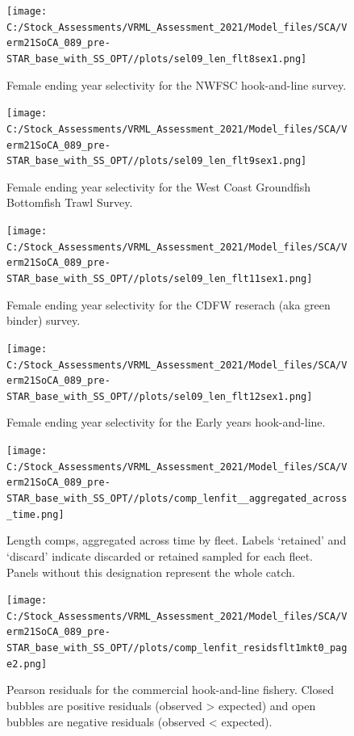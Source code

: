 \documentclass[11pt,
  english,
  a4paper,
]{article}
\begin{document}
\begin{figure}
\centering
\texttt{[image: C:/Stock\_Assessments/VRML\_Assessment\_2021/Model\_files/SCA/Verm21SoCA\_089\_pre-STAR\_base\_with\_SS\_OPT//plots/sel09\_len\_flt8sex1.png]}
\caption{Female ending year selectivity for the NWFSC hook-and-line survey.\label{fig:endyr-selex-NWFSC-HKL}}
\end{figure}

\begin{figure}
\centering
\texttt{[image: C:/Stock\_Assessments/VRML\_Assessment\_2021/Model\_files/SCA/Verm21SoCA\_089\_pre-STAR\_base\_with\_SS\_OPT//plots/sel09\_len\_flt9sex1.png]}
\caption{Female ending year selectivity for the West Coast Groundfish Bottomfish Trawl Survey.\label{fig:endyr-selex-NWFSC-TWL}}
\end{figure}

\begin{figure}
\centering
\texttt{[image: C:/Stock\_Assessments/VRML\_Assessment\_2021/Model\_files/SCA/Verm21SoCA\_089\_pre-STAR\_base\_with\_SS\_OPT//plots/sel09\_len\_flt11sex1.png]}
\caption{Female ending year selectivity for the CDFW reserach (aka green binder) survey.\label{fig:endyr-selex-CDFW-RESEARCH}}
\end{figure}

\begin{figure}
\centering
\texttt{[image: C:/Stock\_Assessments/VRML\_Assessment\_2021/Model\_files/SCA/Verm21SoCA\_089\_pre-STAR\_base\_with\_SS\_OPT//plots/sel09\_len\_flt12sex1.png]}
\caption{Female ending year selectivity for the Early years hook-and-line.\label{fig:endyr-selex-EARLY-HKL}}
\end{figure}

\FloatBarrier

\FloatBarrier

\begin{figure}
\centering
\texttt{[image: C:/Stock\_Assessments/VRML\_Assessment\_2021/Model\_files/SCA/Verm21SoCA\_089\_pre-STAR\_base\_with\_SS\_OPT//plots/comp\_lenfit\_\_aggregated\_across\_time.png]}
\caption{Length comps, aggregated across time by fleet. Labels `retained' and `discard' indicate discarded or retained sampled for each fleet. Panels without this designation represent the whole catch.\label{fig:lenfits-all}}
\end{figure}

\FloatBarrier

\begin{figure}
\centering
\texttt{[image: C:/Stock\_Assessments/VRML\_Assessment\_2021/Model\_files/SCA/Verm21SoCA\_089\_pre-STAR\_base\_with\_SS\_OPT//plots/comp\_lenfit\_residsflt1mkt0\_page2.png]}
\caption{Pearson residuals for the commercial hook-and-line fishery. Closed bubbles are positive residuals (observed \textgreater{} expected) and open bubbles are negative residuals (observed \textless{} expected).\label{fig:len-pearson-COM-HKL}}
\end{figure}
\end{document}
